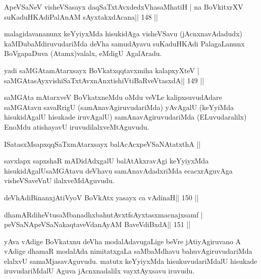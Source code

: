 
\begin{shl}
ApeVSaNeV visheVSasayx daqSaTxtAvxdedxVhasaMhatiH |
na BoVkitxrXV suKaduHKAdiPalAnAM sAyxtakxdAcana\hfill || 148 ||
\end{shl}

\begin{artha}
malagidavananunx keYyiyxMda hisukidAga visheVSavu (jAcnxnavAdadudx) kaMDubaMdiruvudariMda deVha samudAyavu suKaduHKAdi PalagaLanunx BoVgapaDuva (Atamx)valalx, eMdigU AgalAradu.
\end{artha}


\begin{shl}
yadi saMGAtamAtarxsayx BoVkatxqqtavxmiha kalapxyXteV |
saMGAtasAyxvishiSaTxtAvxnAnxtishiVtiBaRveVtasxdA\hfill || 149 ||
\end{shl}

\begin{artha}
saMGAta mAtarxveV BoVkatxneMdu oMdu veVLe kalipxsuvudAdare saMGAtavu 
savaRrigU (samAnavAgiruvudariMda) yAvAgalU (keYyiMda hisukidAgalU 
hisukade iruvAgalU) samAnavAgiruvudariMda (ELuvudaralilx) EnoMdu 
atishayavU iruvudilalxveMtAguvudu.
\end{artha}


\begin{shl}
ISatasxMsapxqqSaTxmAtarxsayx balAcAcx\s\s peVSaNAtatxthA ||
\end{shl}

\begin{artha}
savxlapx sapxshaR mADidAdxgalU balAtAkxravAgi keYyiyxMda hisukidAgalU\break saMGAtavu deVhavu samAnavAdadxriMda ecacxrAguvAga visheVSaveVnU ilalxveMdAguvudu.
\end{artha}

\begin{shl}
deVhAdiBinanxjAtiVyoV BoVkAtx yasayx ca vAdinaH\hfill || 150 ||
\end{shl}

\begin{shl}
dhamARdiheVtusaMbanadhxbahutAvxtfsAyxtasxmacnajxsamf |
peVSaNApeVSaNakaqtaveVdanAyAM BaveVdiBxdA\hfill || 151 ||
\end{shl}

\begin{artha}
yAva vAdige BoVkatxnu deVha modalAdavugaLige beVre jAtiyAgiruvano A  vAdige dhamaR modalAda nimitatxgaLa saMbaMdhavu bahuvAgiruvudariMda  elalxvU samaMjasavAguvudu. matutx keYyiyxMda hisukuvudariMdalU hisukade iruvudariMdalU Aguva jAcnxnadalilx vayxtAyxsavu iruvudu.
\end{artha}

